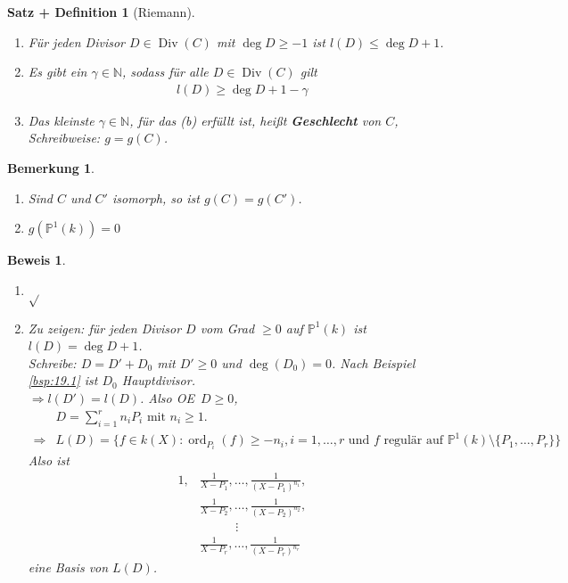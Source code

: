 \documentclass[a4paper,12pt]{report}
\theoremstyle{break}
\newtheorem{SatzDef}[Satz]{Satz + Definition}
\newtheorem{Bem}[Def]{Bemerkung}
\theoremstyle{nonumberbreak}
\theoremstyle{nonumberplain}
\newtheorem{Bew}{Beweis}
\newcommand{\emp}[1]{\textbf{\emph{#1}}}
\newcommand{\begriff}[1]{{\index{#1}}\emp{#1}}
\DeclareMathOperator{\Div}{Div}
\DeclareMathOperator{\ord}{ord}
\renewcommand{\OE}{O\!\!E~}
\begin{document}
\begin{SatzDef}[Riemann]
  \label{satz:8}
  \begin{enumerate}
  \item Für jeden Divisor $D\in \Div(C)$ mit $\deg D\geq -1$ ist $l(D)\leq\deg D+1$.
  \item Es gibt ein $\gamma\in\mathbb N$, sodass für alle $D\in\Div(C)$ gilt
    \begin{align*}
      l(D)\geq\deg D+1-\gamma
    \end{align*}
  \item Das kleinste $\gamma\in\mathbb N$, für das (b) erfüllt ist, heißt \begriff{Geschlecht} von $C$, 
    Schreibweise: $g=g(C)$.
  \end{enumerate}
\end{SatzDef}

\begin{Bem}
  \label{bem:20.2}
  \begin{enumerate}
  \item Sind $C$ und $C'$ isomorph, so ist $g(C)=g(C')$.
  \item $g(\mathbb P^1(k))=0$
  \end{enumerate}
\end{Bem}

\begin{Bew}
  \begin{enumerate}
  \item $\sqrt{}$
  \item Zu zeigen: für jeden Divisor $D$ vom Grad $\geq0$ auf $\mathbb P^1(k)$ ist $l(D)=\deg D+1$. \\
    Schreibe: $D=D'+D_0$ mit $D'\geq0$ und $\deg(D_0)=0$. Nach Beispiel \ref{bsp:19.1} ist $D_0$ Hauptdivisor. \\
    $\Rightarrow l(D')=l(D)$. Also \OE $D\geq0$,
    \begin{align*}
      & D=\sum_{i=1}^rn_iP_i\text{ mit $n_i\geq1$.} \\
      \Rightarrow & L(D)=\{f\in k(X):\ord_{P_i}(f)\geq-n_i,i=1,\dots,r \text{ und $f$ regulär auf } \mathbb P^1(k)\setminus\{P_1,\dots,P_r\}\}
    \end{align*}
    Also ist
    \begin{align*}
      1,&\frac{1}{X-P_1},\dots,\frac{1}{(X-P_1)^{n_1}}, \\
      &\frac{1}{X-P_2},\dots,\frac{1}{(X-P_2)^{n_2}},\\
      & ~~~~~~~~~~~~~\vdots \\
      &\frac{1}{X-P_r},\dots,\frac{1}{(X-P_r)^{n_r}}
    \end{align*}
    eine Basis von $L(D)$.
  \end{enumerate}
\end{Bew}
\end{document}
